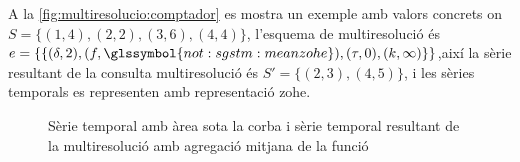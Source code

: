 \begin{itemize}
    A la \autoref{fig:multiresolucio:comptador} es mostra un exemple
    amb valors concrets on $S=\{ (1,4),(2,2),(3,6),(4,4)\}$, l'esquema
    de multiresolució és
    $e=\{\{(\delta,2),(f,\glssymbol{not:sgstm:meanzohe}),(\tau,0),(k,\infty)\}
    \}$,així la sèrie resultant de la consulta multiresolució
    és $S'=\{ (2,3),(4,5)\}$, i les sèries temporals es representen amb
    representació \gls{zohe}.


\begin{figure}[tp]
  \centering


     \qquad


      \caption{Sèrie temporal amb àrea sota la corba i sèrie temporal
        resultant de la multiresolució amb agregació mitjana de la
        funció}
  \label{fig:multiresolucio:comptador}
\end{figure}






  \end{itemize}
  






